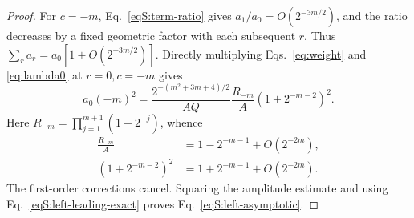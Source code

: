 \documentclass[journal,twocolumn]{IEEEtran}
\theoremstyle{definition}
\theoremstyle{plain}
\begin{document}
\begin{proof}
For $c=-m$, Eq.~\eqref{eqS:term-ratio} gives
$a_1/a_0=O(2^{-3m/2})$, and the ratio decreases by a fixed geometric
factor with each subsequent $r$.  Thus
$\sum_ra_r=a_0[1+O(2^{-3m/2})]$.  Directly
multiplying Eqs.~\eqref{eq:weight} and
\eqref{eq:lambda0} at $r=0,c=-m$ gives
\begin{equation}
 a_0(-m)^2=\frac{2^{-(m^2+3m+4)/2}}{AQ}
 \frac{R_{-m}}{A}(1+2^{-m-2})^2.
 \label{eqS:left-leading-exact}
\end{equation}
Here $R_{-m}=\prod_{j=1}^{m+1}(1+2^{-j})$, whence
\begin{equation}
 \begin{aligned}
 \frac{R_{-m}}A&=1-2^{-m-1}+O(2^{-2m}),\\
 (1+2^{-m-2})^2&=1+2^{-m-1}+O(2^{-2m}).
 \end{aligned}
\end{equation}
The first-order corrections cancel.  Squaring the amplitude estimate and
using Eq.~\eqref{eqS:left-leading-exact} proves
Eq.~\eqref{eqS:left-asymptotic}.


\end{proof}
\end{document}

